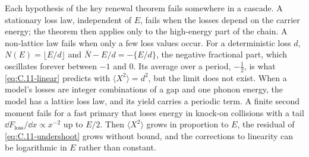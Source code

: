 Each hypothesis of the key renewal theorem fails somewhere in a cascade. A stationary loss law, independent of $E$, fails when the losses depend on the carrier energy; the theorem then applies only to the high-energy part of the chain. A non-lattice law fails when only a few loss values occur. For a deterministic loss $d$, $N(E) = \lfloor E/d\rfloor$ and $\bar N - E/d = -\{E/d\}$, the negative fractional part, which oscillates forever between $-1$ and 0. Its average over a period, $-\tfrac12$, is what \cref{eq:C.11-linear} predicts with $\langle X^2\rangle = d^2$, but the limit does not exist. When a model's losses are integer combinations of a gap and one phonon energy, the model has a lattice loss law, and its yield carries a periodic term. A finite second moment fails for a fast primary that loses energy in knock-on collisions with a tail $\dd F_{\mathrm{loss}}/\dd x \propto x^{-2}$ up to $E/2$. Then $\langle X^2\rangle$ grows in proportion to $E$, the residual of \cref{eq:C.11-undershoot} grows without bound, and the corrections to linearity can be logarithmic in $E$ rather than constant.
